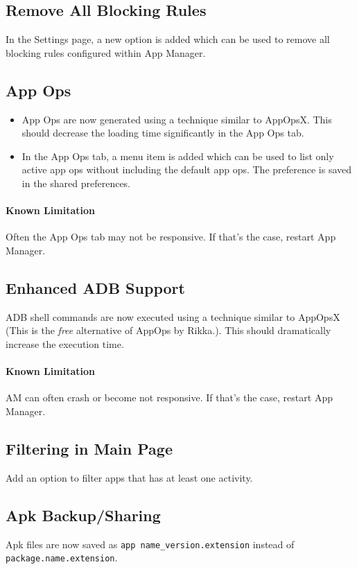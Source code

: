 \subsection{Remove All Blocking Rules}
In the Settings page, a new option is added which can be used to remove all blocking rules configured within App Manager.

\subsection{App Ops}
\begin{itemize}
    \item App Ops are now generated using a technique similar to AppOpsX. This should decrease the loading time
    significantly in the App Ops tab.
    \item In the App Ops tab, a menu item is added which can be used to list only active app ops without including the
    default app ops. The preference is saved in the shared preferences.
\end{itemize}

\paragraph{Known Limitation} Often the App Ops tab may not be responsive. If that's the case, restart App Manager.

\subsection{Enhanced ADB Support}
ADB shell commands are now executed using a technique similar to AppOpsX (This is the \textit{free} alternative of AppOps by Rikka.).
This should dramatically increase the execution time.

\paragraph{Known Limitation} AM can often crash or become not responsive. If that's the case, restart App Manager.

\subsection{Filtering in Main Page}
Add an option to filter apps that has at least one activity.

\subsection{Apk Backup/Sharing}
Apk files are now saved as \texttt{app name\_version.extension} instead of \texttt{package.name.extension}.

